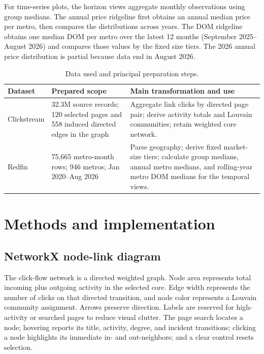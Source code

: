 \documentclass[11pt,letterpaper]{article}
\begin{document}
For time-series plots, the horizon views aggregate monthly observations using group medians. The annual price ridgeline first obtains an annual median price per metro, then compares the distributions across years. The DOM ridgeline obtains one median DOM per metro over the latest 12 months (September 2025--August 2026) and compares those values by the fixed size tiers. The 2026 annual price distribution is partial because data end in August 2026.

\begin{table}[H]
\centering\small
\begin{tabularx}{\textwidth}{p{}p{}Y}
\toprule
\textbf{Dataset} & \textbf{Prepared scope} & \textbf{Main transformation and use} \\
\midrule
Clickstream & 32.3M source records; 120 selected pages and 558 induced directed edges in the graph & Aggregate link clicks by directed page pair; derive activity totals and Louvain communities; retain weighted core network. \\
Redfin & 75,665 metro-month rows; 946 metros; Jan 2020--Aug 2026 & Parse geography; derive fixed market-size tiers; calculate group medians, annual metro medians, and rolling-year metro DOM medians for the temporal views. \\
\bottomrule
\end{tabularx}
\caption{Data used and principal preparation steps.}
\label{tab:data}
\end{table}

\section{Methods and implementation}
\subsection{NetworkX node-link diagram}\label{sec:network}
The click-flow network is a directed weighted graph. Node area represents total incoming plus outgoing activity in the selected core. Edge width represents the number of clicks on that directed transition, and node color represents a Louvain community assignment. Arrows preserve direction. Labels are reserved for high-activity or searched pages to reduce visual clutter. The page search locates a node; hovering reports its title, activity, degree, and incident transitions; clicking a node highlights its immediate in- and out-neighbors; and a clear control resets selection.
\end{document}
